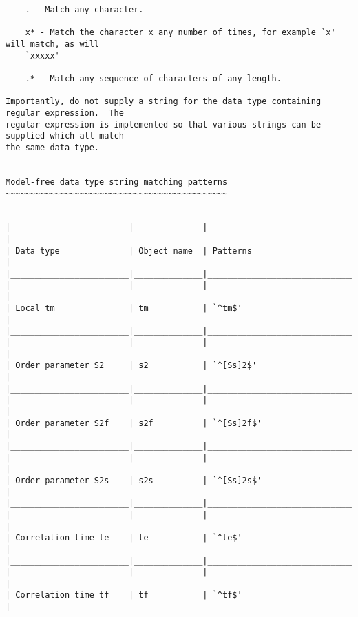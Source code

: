 {\begin{verbatim}
    . - Match any character.

    x* - Match the character x any number of times, for example `x' will match, as will
    `xxxxx'

    .* - Match any sequence of characters of any length.

Importantly, do not supply a string for the data type containing regular expression.  The
regular expression is implemented so that various strings can be supplied which all match
the same data type.


Model-free data type string matching patterns
~~~~~~~~~~~~~~~~~~~~~~~~~~~~~~~~~~~~~~~~~~~~~

____________________________________________________________________________________________
|                        |              |                                                  |
| Data type              | Object name  | Patterns                                         |
|________________________|______________|__________________________________________________|
|                        |              |                                                  |
| Local tm               | tm           | `^tm$'                                           |
|________________________|______________|__________________________________________________|
|                        |              |                                                  |
| Order parameter S2     | s2           | `^[Ss]2$'                                        |
|________________________|______________|__________________________________________________|
|                        |              |                                                  |
| Order parameter S2f    | s2f          | `^[Ss]2f$'                                       |
|________________________|______________|__________________________________________________|
|                        |              |                                                  |
| Order parameter S2s    | s2s          | `^[Ss]2s$'                                       |
|________________________|______________|__________________________________________________|
|                        |              |                                                  |
| Correlation time te    | te           | `^te$'                                           |
|________________________|______________|__________________________________________________|
|                        |              |                                                  |
| Correlation time tf    | tf           | `^tf$'                                           |

\end{verbatim}}
